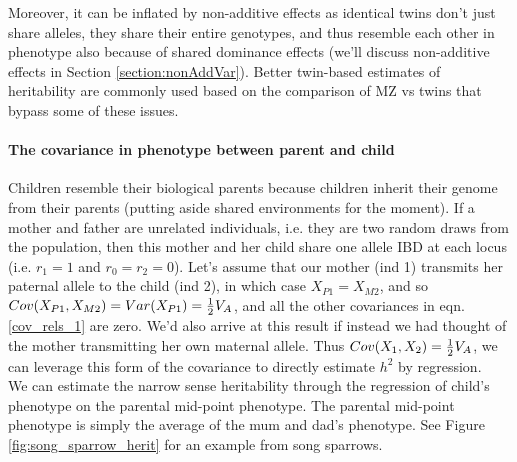 Moreover, it can
be inflated by non-additive effects as identical twins don't just share alleles, they share their entire genotypes, and thus 
resemble each other in phenotype also because of shared dominance
effects (we'll discuss non-additive effects in Section \ref{section:nonAddVar}). Better twin-based estimates of heritability are commonly
used based on the comparison of MZ vs twins that bypass some of these issues.\\



\paragraph{The covariance in phenotype between parent and child}

Children resemble their biological parents because children inherit their genome from
their parents (putting aside shared environments for the moment). If a
mother and father are unrelated individuals, i.e. they are two
random draws from the population, then this mother and her child share
one allele IBD at each locus (i.e. $r_1=1$ and $r_0=r_2=0$). Let's
assume that our mother (ind 1) transmits her paternal allele to the child (ind 2), in which
case $X_{P1}=X_{M2}$, and so $Cov(X_{P1},X_{M2})=Var(X_{P1})=\tfrac{1}{2}
V_A$, and all
the other covariances in eqn. \ref{cov_rels_1} are zero. We'd also
arrive at this result if instead we had thought of the mother transmitting her own
maternal allele. Thus $Cov(X_1,X_2) = \tfrac{1}{2}
V_A$, we can leverage this form of the covariance to directly estimate
$h^2$ by regression.\\

We can estimate the narrow sense heritability through the regression of child's phenotype on the parental mid-point
phenotype. The parental mid-point phenotype is simply the average of
the mum and dad's phenotype. See Figure \ref{fig:song_sparrow_herit}
for an example from song sparrows. 

